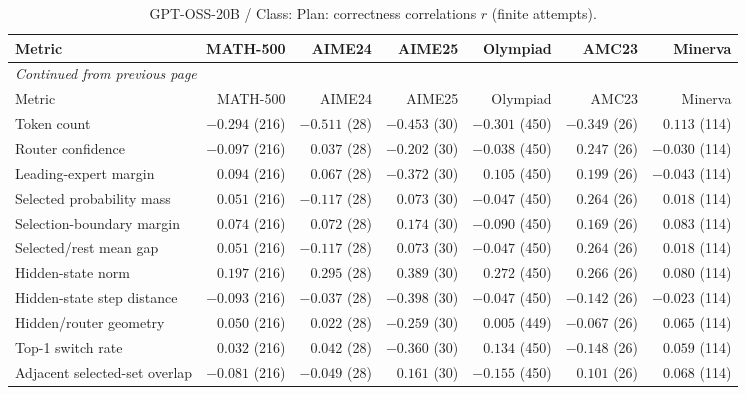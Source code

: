 \begingroup\scriptsize\setlength{\tabcolsep}{4pt}
\begin{longtable}{@{}lrrrrrr@{}}
\caption{GPT-OSS-20B / Class: Plan: correctness correlations $r$ (finite attempts).}\label{tab:multi-gptoss-class-Plan}\\
\toprule
Metric & MATH-500 & AIME24 & AIME25 & Olympiad & AMC23 & Minerva \\
\midrule\endfirsthead
\multicolumn{7}{l}{\textit{Continued from previous page}}\\
\toprule
Metric & MATH-500 & AIME24 & AIME25 & Olympiad & AMC23 & Minerva \\
\midrule\endhead
\bottomrule\endfoot
Token count & $-0.294$ (216) & $-0.511$ (28) & $-0.453$ (30) & $-0.301$ (450) & $-0.349$ (26) & $0.113$ (114) \\
Router confidence & $-0.097$ (216) & $0.037$ (28) & $-0.202$ (30) & $-0.038$ (450) & $0.247$ (26) & $-0.030$ (114) \\
Leading-expert margin & $0.094$ (216) & $0.067$ (28) & $-0.372$ (30) & $0.105$ (450) & $0.199$ (26) & $-0.043$ (114) \\
Selected probability mass & $0.051$ (216) & $-0.117$ (28) & $0.073$ (30) & $-0.047$ (450) & $0.264$ (26) & $0.018$ (114) \\
Selection-boundary margin & $0.074$ (216) & $0.072$ (28) & $0.174$ (30) & $-0.090$ (450) & $0.169$ (26) & $0.083$ (114) \\
Selected/rest mean gap & $0.051$ (216) & $-0.117$ (28) & $0.073$ (30) & $-0.047$ (450) & $0.264$ (26) & $0.018$ (114) \\
Hidden-state norm & $0.197$ (216) & $0.295$ (28) & $0.389$ (30) & $0.272$ (450) & $0.266$ (26) & $0.080$ (114) \\
Hidden-state step distance & $-0.093$ (216) & $-0.037$ (28) & $-0.398$ (30) & $-0.047$ (450) & $-0.142$ (26) & $-0.023$ (114) \\
Hidden/router geometry & $0.050$ (216) & $0.022$ (28) & $-0.259$ (30) & $0.005$ (449) & $-0.067$ (26) & $0.065$ (114) \\
Top-1 switch rate & $0.032$ (216) & $0.042$ (28) & $-0.360$ (30) & $0.134$ (450) & $-0.148$ (26) & $0.059$ (114) \\
Adjacent selected-set overlap & $-0.081$ (216) & $-0.049$ (28) & $0.161$ (30) & $-0.155$ (450) & $0.101$ (26) & $0.068$ (114) \\
\end{longtable}\endgroup

